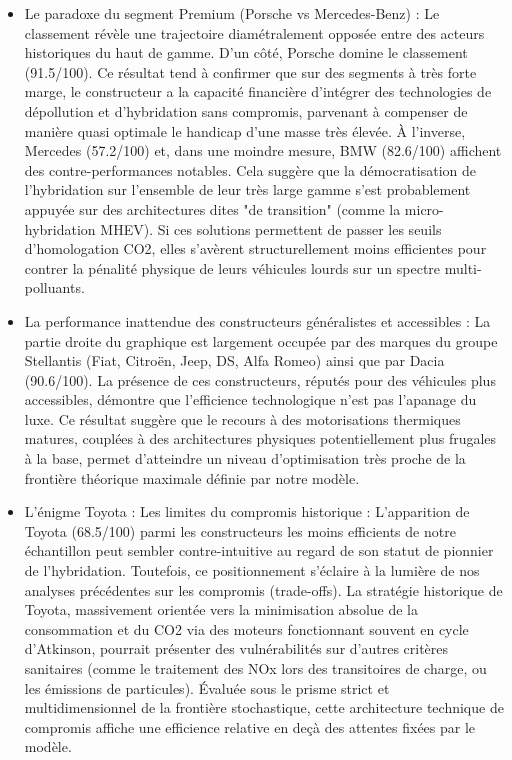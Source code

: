 \begin{itemize}
    \item Le paradoxe du segment Premium (Porsche vs Mercedes-Benz) : Le classement révèle une trajectoire diamétralement opposée entre des acteurs historiques du haut de gamme. D'un côté, Porsche domine le classement (91.5/100). Ce résultat tend à confirmer que sur des segments à très forte marge, le constructeur a la capacité financière d'intégrer des technologies de dépollution et d'hybridation sans compromis, parvenant à compenser de manière quasi optimale le handicap d'une masse très élevée. À l'inverse, Mercedes (57.2/100) et, dans une moindre mesure, BMW (82.6/100) affichent des contre-performances notables. Cela suggère que la démocratisation de l'hybridation sur l'ensemble de leur très large gamme s'est probablement appuyée sur des architectures dites "de transition" (comme la micro-hybridation MHEV). Si ces solutions permettent de passer les seuils d'homologation CO2, elles s'avèrent structurellement moins efficientes pour contrer la pénalité physique de leurs véhicules lourds sur un spectre multi-polluants.

    \vspace{0.5em}

    \item La performance inattendue des constructeurs généralistes et accessibles : La partie droite du graphique est largement occupée par des marques du groupe Stellantis (Fiat, Citroën, Jeep, DS, Alfa Romeo) ainsi que par Dacia (90.6/100). La présence de ces constructeurs, réputés pour des véhicules plus accessibles, démontre que l'efficience technologique n'est pas l'apanage du luxe. Ce résultat suggère que le recours à des motorisations thermiques matures, couplées à des architectures physiques potentiellement plus frugales à la base, permet d'atteindre un niveau d'optimisation très proche de la frontière théorique maximale définie par notre modèle.

    \vspace{0.5em}

    \item L'énigme Toyota : Les limites du compromis historique : L'apparition de Toyota (68.5/100) parmi les constructeurs les moins efficients de notre échantillon peut sembler contre-intuitive au regard de son statut de pionnier de l'hybridation. Toutefois, ce positionnement s'éclaire à la lumière de nos analyses précédentes sur les compromis (trade-offs). La stratégie historique de Toyota, massivement orientée vers la minimisation absolue de la consommation et du CO2 via des moteurs fonctionnant souvent en cycle d'Atkinson, pourrait présenter des vulnérabilités sur d'autres critères sanitaires (comme le traitement des NOx lors des transitoires de charge, ou les émissions de particules). Évaluée sous le prisme strict et multidimensionnel de la frontière stochastique, cette architecture technique de compromis affiche une efficience relative en deçà des attentes fixées par le modèle.
\end{itemize}

